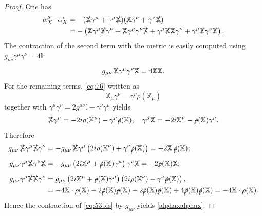 \documentclass[11pt]{article}
\newcommand{\XX}{{\mathbb X}}
\begin{document}
\begin{proof} One has
  \begin{align}
  \label{eq:53}
\alpha^\mu_X\cdot \alpha^\nu_X  &= -
  (\slashed\XX \gamma^\mu + \gamma^\mu\slashed\XX)   (\slashed\XX
  \gamma^\nu + \gamma^\nu\slashed\XX) \\
\label{eq:53bis}
&=-\left(
   \slashed \XX \gamma^\mu \slashed\XX\gamma^\nu+\slashed\XX \gamma^\mu  \gamma^\nu\slashed\XX+   \gamma^\mu\slashed\XX\slashed\XX
  \gamma^\nu +   \gamma^\mu\slashed\XX\gamma^\nu\slashed\XX\right).
\end{align}
The contraction of the second term with the metric is easily computed using $g_{\mu\nu}\gamma^\mu\gamma^\nu = 4 \mathbb I$: 
\begin{equation}
  \label{eq:203}
 g_{\mu\nu} \, \slashed \XX \gamma^\mu  \gamma^\nu\slashed \XX = 4\slashed
\XX\slashed \XX. 
\end{equation}
For the remaining terms, \eqref{eq:76} written as
\begin{equation}
\XX_\mu \gamma^\nu = \gamma^\nu \rho(\XX_\mu)
\label{eq:154}
\end{equation}
together with
$\gamma^\mu\gamma^\nu = 2g^{\mu\nu}{\mathbb I} - \gamma^\nu\gamma^\mu$ yields
\begin{align}
  \label{eq:40}
  \slashed \XX \gamma^\mu = -2i\rho(\XX^\mu) -\gamma^\mu \slashed\rho(\XX),
 \quad\gamma^\mu \slashed \XX = -2i\XX^\mu- \slashed\rho(\XX)\gamma^\mu.
 \end{align}
Therefore
\begin{align}
  \label{eq:67}\nonumber
g_{\mu\nu}  \,\slashed \XX \gamma^\mu \slashed \XX\gamma^\nu &=-
g_{\mu\nu} \, \slashed \XX \gamma^\mu  \left(  2i\rho(\XX^\nu) + \gamma^\nu
\slashed\rho(\XX) \right) =   - 2\slashed \XX\, \slashed\rho(\XX);\\[5pt] 
g_{\mu\nu}\gamma^\mu\slashed \XX \gamma^\nu\slashed \XX &=
-g_{\mu\nu}\left(2i\XX^\mu +
  \slashed\rho(\XX)\gamma^\mu\right) \gamma^\nu\slashed \XX = - 2 \slashed\rho(\XX)\slashed \XX;
\\[5pt]
\nonumber
g_{\mu\nu}\gamma^\mu\slashed \XX\slashed \XX
  \gamma^\nu  &= g_{\mu\nu}\left( 2i\XX^\mu+
    \slashed\rho(\XX)\gamma^\mu\right)\left(2i\rho(\XX^\nu) + \gamma^\nu
    \slashed\rho(\XX)\right),\\
\nonumber
&=-4 \XX\cdot \rho(\XX) - 2 \slashed\rho(\XX)\slashed\rho(\XX) -  2
\slashed\rho(\XX)\slashed\rho(\XX) + 4\slashed\rho(\XX)
\slashed \rho(\XX) =  - 4 \XX\cdot \rho(\XX).
\end{align}
Hence the contraction of \eqref{eq:53bis} by $g_{\mu\nu}$ yields \eqref{alphaxalphax}.


\end{proof}
\end{document}
